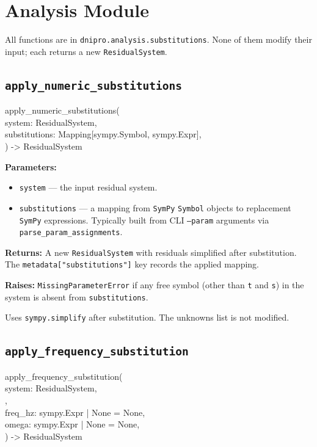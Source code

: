 \documentclass[11pt,a4paper]{article}
\newcommand{\code}[1]{\texttt{#1}}
\newcommand{\sympy}{\texttt{SymPy}}
\newenvironment{apisig}{%
  \begin{trivlist}\item\relax\ttfamily\small
}{%
  \end{trivlist}
}
\begin{document}
\section{Analysis Module}
\label{sec:api-analysis}

All functions are in \code{dnipro.analysis.substitutions}.
None of them modify their input; each returns a new \code{ResidualSystem}.

\subsection{\texttt{apply\_numeric\_substitutions}}
\label{api:apply_numeric_substitutions}

\begin{apisig}
apply\_numeric\_substitutions( \\
\quad system: ResidualSystem, \\
\quad substitutions: Mapping[sympy.Symbol, sympy.Expr], \\
) -> ResidualSystem
\end{apisig}

\textbf{Parameters:}
\begin{itemize}[noitemsep]
    \item \code{system} --- the input residual system.
    \item \code{substitutions} --- a mapping from \sympy{} \code{Symbol} objects
          to replacement \sympy{} expressions.
          Typically built from CLI \code{--param} arguments via
          \code{parse\_param\_assignments}.
\end{itemize}

\textbf{Returns:} A new \code{ResidualSystem} with residuals simplified after
substitution. The \code{metadata["substitutions"]} key records the applied mapping.

\textbf{Raises:} \code{MissingParameterError} if any free symbol (other than
\code{t} and \code{s}) in the system is absent from \code{substitutions}.

Uses \code{sympy.simplify} after substitution.
The unknowns list is not modified.

\subsection{\texttt{apply\_frequency\_substitution}}
\label{api:apply_frequency_substitution}

\begin{apisig}
apply\_frequency\_substitution( \\
\quad system: ResidualSystem, \\
\quad *, \\
\quad freq\_hz: sympy.Expr | None = None, \\
\quad omega: sympy.Expr | None = None, \\
) -> ResidualSystem
\end{apisig}
\end{document}
